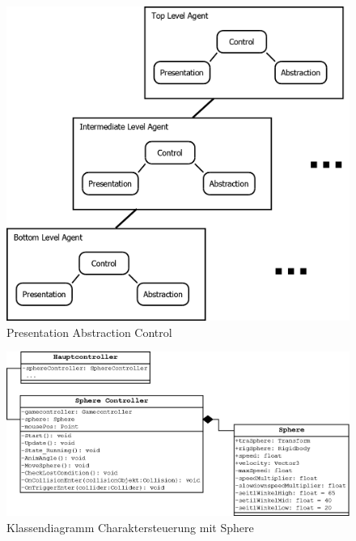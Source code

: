 \begin{figure}[H]
\centering

\caption{Presentation Abstraction Control}
\label{Abb:PAC}
\includegraphics[scale=0.275]{Bilder/Diagramme/PAC.png}
\end{figure}

\begin{figure}[H]
\centering
\caption{Klassendiagramm Charaktersteuerung mit Sphere}
\label{Abb:KlassendiaMain}
\includegraphics[scale=0.3]{Bilder/Diagramme/KlassendiagrammMain.png}
\end{figure}

